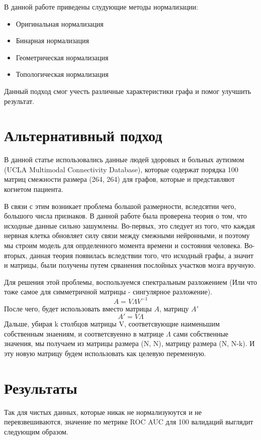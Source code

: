 \documentclass{urticle}
\begin{document}
В данной работе приведены слудующие методы нормализации:
\begin{itemize}
	\item Оригинальная нормализация
	\item Бинарная нормализация
	\item Геометрическая нормализация
	\item Топологическая нормализация			
\end{itemize}

Данный подход смог учесть различные характеристики графа и помог улучшить результат.

\section*{Альтернативный подход}
В данной статье использовались данные людей здоровых и больных аутизмом (UCLA Multimodal Connectivity Database), которые содержат порядка 100 матриц смежности размера (264, 264) для графов, которые и представляют когнетом пациента.

В связи с этим возникает проблема большой размерности, вследсвтии чего, большого числа признаков. В данной работе была проверена теория о том, что исходные данные сильно зашумлены. Во-первых, это следует из того, что каждая нервная клетка обновляет силу связи между смежными нейронными, и поэтому мы строим модель для опрделенного момента времени и состояния человека. Во-вторых, данная теория появилась вследствии того, что исходный графы, а значит и матрицы, были получены путем срванения послойных участков мозга вручную.

Для решения этой проблемы, воспользуемся спектральным разложением (Или что тоже самое для симметричной матрицы - сингулярное разложение). 
$$ A = V \Lambda {V}^{-1} $$
После чего, будет использовать вместо матрицы $A$, матрицу $A'$
$$ A' = V \Lambda $$
Дальше, убирая k столбцов матрицы V, соответсвующие наименьшим собственным знаениям, и соответсвуенно в матрице $\Lambda$ сами собственные значения, мы получаем из матрицы размера (N, N), матрицу размера (N, N-k). И эту новую матрицу будем использовать как целевую переменную.

\section*{Результаты}
Так для чистых данных, которые никак не нормализуюутся и не перевзвешиваются, значение по метрике ROC AUC для 100 валидаций выглядит следующим образом.
\end{document}

